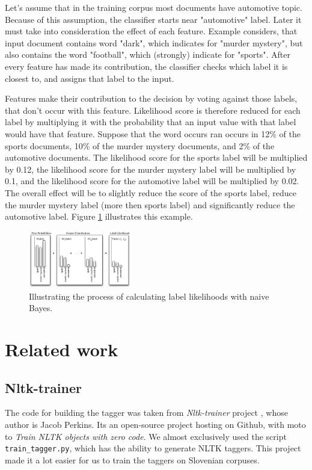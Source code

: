 \documentclass[10pt, conference, compsocconf]{IEEEtran}
\begin{document}
Let's assume that in the training corpus most documents have automotive topic. Because of this assumption, the classifier starts near "automotive" label. Later it must take into consideration the effect of each feature. Example considers, that input document contains word "dark", which indicates for "murder mystery", but also contains the word "football", which (strongly) indicate for "sports". After every feature has made its contribution, the classifier checks which label it is closest to, and assigns that label to the input.

Features make their contribution to the  decision by voting against those labels, that don't occur with this feature. Likelihood score is therefore reduced for each label by multiplying it with the probability that an input value with that label would have that feature. Suppose that the word occurs ran occurs in  12\% of the sports documents, 10\% of the murder mystery documents, and 2\% of the automotive documents. The likelihood score for the sports label will be multiplied by 0.12, the likelihood score for the murder mystery label will be multiplied by 0.1, and the likelihood score for the automotive label will be multiplied by 0.02. The overall effect will be to slightly reduce the score of the sports label, reduce the murder mystery label (more then sports label) and significantly reduce the automotive label. Figure \ref{fig:naive-bayes-bargraph} illustrates this example.

\begin{figure}[htb]
\begin{center}
\includegraphics[width=0.4\textwidth]{naive_bayes_bargraph.png} 
\end{center}
\caption{Illustrating the process of calculating label likelihoods with naive Bayes.}
\label{fig:naive-bayes-bargraph}
\end{figure}

\section{Related work}
\label{relatedWork}
\subsection{Nltk-trainer} %
The code for building the tagger was taken from \textit{Nltk-trainer}  project \cite{nltk-trainer}, whose author is Jacob Perkins.
Its an open-source project hosting on Github, with moto to \textit{Train NLTK objects with zero code}.
We almost exclusively used the script \texttt{train\_tagger.py}, which has the ability to generate NLTK taggers. This project made it a lot easier for us to train the taggers on Slovenian corpuses.
\end{document}
